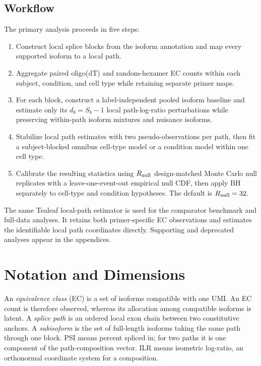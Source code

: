 \documentclass[11pt]{article}
\begin{document}
\subsection*{Workflow}

The primary analysis proceeds in five steps:
\begin{enumerate}[leftmargin=*]
  \item Construct local splice blocks from the isoform annotation and map every supported isoform to a local path.
  \item Aggregate paired oligo(dT) and random-hexamer EC counts within each subject, condition, and cell type while retaining separate primer maps.
  \item For each block, construct a label-independent pooled isoform baseline and estimate only its $d_b=S_b-1$ local path-log-ratio perturbations while preserving within-path isoform mixtures and nuisance isoforms.
  \item Stabilize local path estimates with two pseudo-observations per path, then fit a subject-blocked omnibus cell-type model or a condition model within one cell type.
  \item Calibrate the resulting statistics using \(R_{\rm null}\) design-matched Monte Carlo null replicates with a leave-one-event-out empirical null CDF, then apply BH separately to cell-type and condition hypotheses. The default is \(R_{\rm null}=32\).
\end{enumerate}

The same Tealeaf local-path estimator is used for the comparator benchmark and full-data analyses. It retains both primer-specific EC observations and estimates the identifiable local path coordinates directly. Supporting and deprecated analyses appear in the appendices.

\section*{Notation and Dimensions}

An \emph{equivalence class} (EC) is a set of isoforms compatible with one UMI. An EC count is therefore observed, whereas its allocation among compatible isoforms is latent. A \emph{splice path} is an ordered local exon chain between two constitutive anchors. A \emph{subisoform} is the set of full-length isoforms taking the same path through one block. PSI means percent spliced in; for two paths it is one component of the path-composition vector. ILR means isometric log-ratio, an orthonormal coordinate system for a composition.
\end{document}
